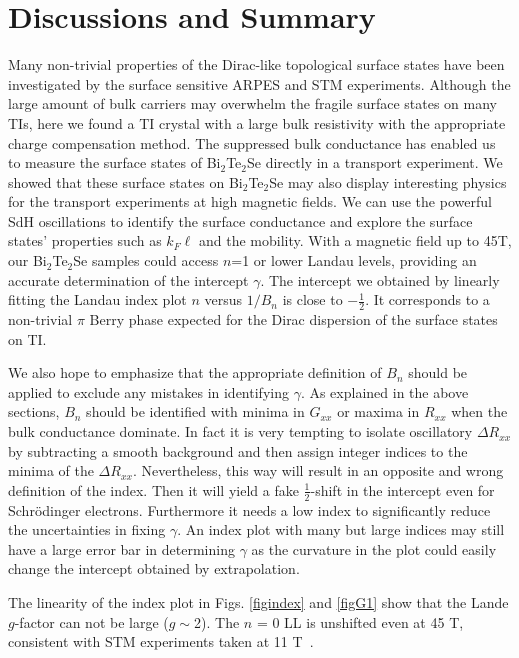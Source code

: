 \section{Discussions and Summary}
\label{sec:bts:summary}


Many non-trivial properties of the Dirac-like topological surface states have been investigated by the surface sensitive ARPES and STM experiments. Although the large amount of bulk carriers may overwhelm the fragile surface states on many TIs, here we found a TI crystal with a large bulk resistivity with the appropriate charge compensation method. The suppressed bulk conductance has enabled us to measure the surface states of Bi$_2$Te$_2$Se directly in a transport experiment. We showed that these surface states on Bi$_2$Te$_2$Se may also display interesting physics for the transport experiments at high magnetic fields. We can use the powerful SdH oscillations to identify the surface conductance and explore the surface states' properties such as $k_F\ell$ and the mobility. With a magnetic field up to 45T, our Bi$_2$Te$_2$Se samples could access $n$=1 or lower Landau levels, providing an accurate determination of the intercept $\gamma$. The intercept we obtained by linearly fitting the Landau index plot $n$ versus $1/B_n$ is close to $-\frac12$. It corresponds to a non-trivial $\pi$ Berry phase expected for the Dirac dispersion of the surface states on TI.  

We also hope to emphasize that the appropriate definition of $B_n$ should be applied to exclude any mistakes in identifying $\gamma$. As explained in the above sections, $B_n$ should be identified with minima in $G_{xx}$ or maxima in $R_{xx}$ when the bulk conductance dominate. In fact it is very tempting to isolate oscillatory $\Delta R_{xx}$ by subtracting a smooth background and then assign integer indices to the minima of the $\Delta R_{xx}$. Nevertheless, this way will result in an opposite and wrong definition of the index. Then it will yield a fake $\frac12$-shift in the intercept even for Schr\"{o}dinger electrons. Furthermore it needs a low index to significantly reduce the uncertainties in fixing $\gamma$. An index plot with many but large indices may still have a large error bar in determining $\gamma$ as the curvature in the plot could easily change the intercept obtained by extrapolation. 

The linearity of the index plot in Figs. \ref{figindex} and \ref{figG1} show that the Lande
$g$-factor can not be large ($g\sim$2). The $n$ = 0 LL is unshifted even at 45 T, consistent with 
STM experiments taken at 11 T~\cite{Hanaguri,Xue10}.

